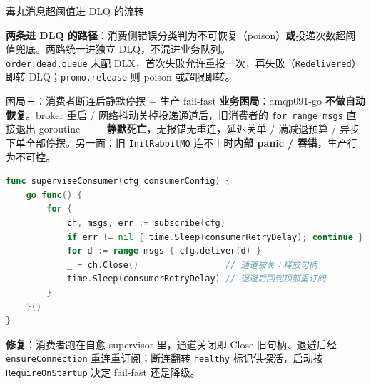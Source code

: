 \documentclass[aspectratio=169,11pt]{beamer}
\begin{document}
\begin{frame}[shrink]{毒丸消息超阈值进 DLQ 的流转}
\begin{center}
\end{center}
\vspace{1mm}
\small \textbf{两条进 DLQ 的路径}：消费侧错误分类判为不可恢复（poison）\textbf{或}投递次数超阈值兜底。两路统一进独立 DLQ，不混进业务队列。\\
\texttt{order.dead.queue} 未配 DLX，首次失败允许重投一次，再失败（\texttt{Redelivered}）即转 DLQ；\texttt{promo.release} 则 poison 或超限即转。
\end{frame}

\begin{frame}{困局三：消费者断连后静默停摆 + 生产 fail-fast}
\textbf{业务困局}：amqp091-go \textbf{不做自动恢复}。broker 重启 / 网络抖动关掉投递通道后，旧消费者的 \texttt{for range msgs} 直接退出 goroutine —— \textbf{静默死亡}，无报错无重连，延迟关单 / 满减退预算 / 异步下单全部停摆。另一面：旧 \texttt{InitRabbitMQ} 连不上时\textbf{内部 panic / 吞错}，生产行为不可控。
\begin{lstlisting}[language=Go,firstnumber=26,
  caption={}]
func superviseConsumer(cfg consumerConfig) {
    go func() {
        for {
            ch, msgs, err := subscribe(cfg)
            if err != nil { time.Sleep(consumerRetryDelay); continue }
            for d := range msgs { cfg.deliver(d) }
            _ = ch.Close()                 // 通道被关：释放句柄
            time.Sleep(consumerRetryDelay) // 退避后回到顶部重订阅
        }
    }()
}
\end{lstlisting}
\small \textbf{修复}：消费者跑在自愈 supervisor 里，通道关闭即 Close 旧句柄、退避后经 \texttt{ensureConnection} 重连重订阅；断连翻转 \texttt{healthy} 标记供探活，启动按 \texttt{RequireOnStartup} 决定 fail-fast 还是降级。
\end{frame}
\end{document}
